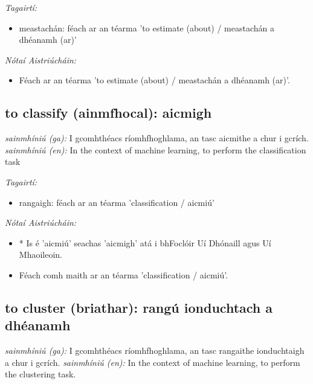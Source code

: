 \documentclass{article}
\begin{document}
 \noindent \textit{Tagairtí:}
\begin{itemize}
	\item meastachán: féach ar an téarma 'to estimate (about) / meastachán a dhéanamh (ar)'
\end{itemize}

 \noindent \textit{Nótaí Aistriúcháin:}
\begin{itemize}
	\item Féach ar an téarma 'to estimate (about) / meastachán a dhéanamh (ar)'.
\end{itemize}


\subsection*{to classify (ainmfhocal): aicmigh} 
 \noindent \textit{sainmhíniú (ga):} I gcomhthéacs ríomhfhoghlama, an tasc aicmithe a chur i gcrích.
\newline\newline
 \noindent \textit{sainmhíniú (en):} In the context of machine learning, to perform the classification task
\newline

 \noindent \textit{Tagairtí:}
\begin{itemize}
	\item rangaigh: féach ar an téarma 'classification / aicmiú'
\end{itemize}

 \noindent \textit{Nótaí Aistriúcháin:}
\begin{itemize}
	\item * Is é 'aicmiú' seachas 'aicmigh' atá i bhFoclóir Uí Dhónaill agus Uí Mhaoileoin.
	\item Féach comh maith ar an téarma 'classification / aicmiú'.
\end{itemize}


\subsection*{to cluster (briathar): rangú ionduchtach a dhéanamh} 
 \noindent \textit{sainmhíniú (ga):} I gcomhthéacs ríomhfhoghlama, an tasc rangaithe ionduchtaigh a chur i gcrích.
\newline\newline
 \noindent \textit{sainmhíniú (en):} In the context of machine learning, to perform the clustering task.
\newline
\end{document}
